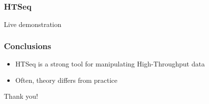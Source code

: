 \documentclass{beamer}
\begin{document}
\begin{frame}
    \frametitle{HTSeq}
    Live demonstration
\end{frame}

\begin{frame}
    \frametitle{Conclusions}
    \begin{itemize}
        \item HTSeq is a strong tool for manipulating High-Throughput data
        \pause
        \item Often, theory differs from practice
    \end{itemize}
\end{frame}

\begin{frame}
    \Huge{\centerline{Thank you!}}
\end{frame}


\end{document}
